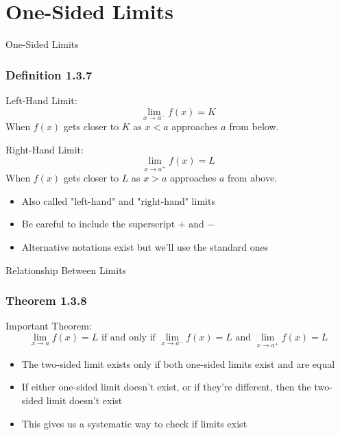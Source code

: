 \documentclass[aspectratio=169]{beamer}
\newcommand{\limxa}[1]{\lim_{x \to a} #1}
\newcommand{\limxap}[1]{\lim_{x \to a^+} #1}
\newcommand{\limxam}[1]{\lim_{x \to a^-} #1}
\begin{document}
\section{One-Sided Limits}

\begin{frame}{One-Sided Limits}
\frametitle{Definition 1.3.7}

\begin{block}{Left-Hand Limit:}
$$\limxam{f(x)} = K$$
When $f(x)$ gets closer to $K$ as $x < a$ approaches $a$ from below.
\end{block}

\begin{block}{Right-Hand Limit:}
$$\limxap{f(x)} = L$$
When $f(x)$ gets closer to $L$ as $x > a$ approaches $a$ from above.
\end{block}

\begin{itemize}
\item Also called "left-hand" and "right-hand" limits
\item Be careful to include the superscript $+$ and $-$ 
\item Alternative notations exist but we'll use the standard ones
\end{itemize}

\end{frame}

\begin{frame}{Relationship Between Limits}
\frametitle{Theorem 1.3.8}

\begin{block}{Important Theorem:}
$$\limxa{f(x)} = L \text{ if and only if } \limxam{f(x)} = L \text{ and } \limxap{f(x)} = L$$
\end{block}

\begin{itemize}
\item The two-sided limit exists only if both one-sided limits exist and are equal
\item If either one-sided limit doesn't exist, or if they're different, then the two-sided limit doesn't exist
\item This gives us a systematic way to check if limits exist
\end{itemize}

\end{frame}
\end{document}
